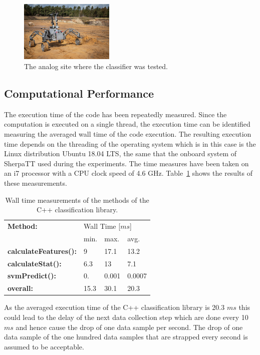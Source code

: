 \begin{figure}[!htbp]
    \centering
        \includegraphics[width=0.4\textwidth]{../figures/sandmine_v2.jpg}
    \caption{The analog site where the classifier was tested.}
    \label{fig:finaltest}
\end{figure}

\FloatBarrier

\subsection{Computational Performance}

The execution time of the code has been repeatedly measured. 
Since the computation is executed on a single thread, the execution time can be identified measuring the averaged wall time of the code execution. 
The resulting execution time depends on the threading of the operating system which is in this case is the Linux distribution Ubuntu 18.04 LTS, the same that the onboard system of SherpaTT used during the experiments. 
The time measures have been taken on an i7 processor with a CPU clock speed of 4.6 GHz. 
Table~\ref{table:compmeasurments} shows the results of these measurements. 


\begin{table}[htb!]
   \centering
    \begin{tabularx}{\columnwidth}{X|XXX}
        \textbf{Method:} & \multicolumn{3}{X}{Wall Time [$ms$]} \\
        &min.&max.&avg.\\
        \hline
        \hline
        \textbf{calculateFeatures():} & 9&  17.1& 13.2 \\
        \textbf{calculateStat():}     & 6.3 & 13 & 7.1 \\
        \textbf{svmPredict():}        &  0. &  0.001 & 0.0007  \\
        \hline
        \textbf{overall:}             & 15.3 & 30.1 &20.3  \\
    \end{tabularx}	
    \caption{Wall time measurements of the methods of the C++ classification library.}
    \label{table:compmeasurments}
\end{table}

As the averaged execution time of the C++ classification library is 20.3 $ms$ this could lead to the delay of the next data collection step which are done every 10 $ms$ and hence cause the drop of one data sample per second. 
The drop of one data sample of the one hundred data samples that are strapped every second is assumed to be acceptable.

